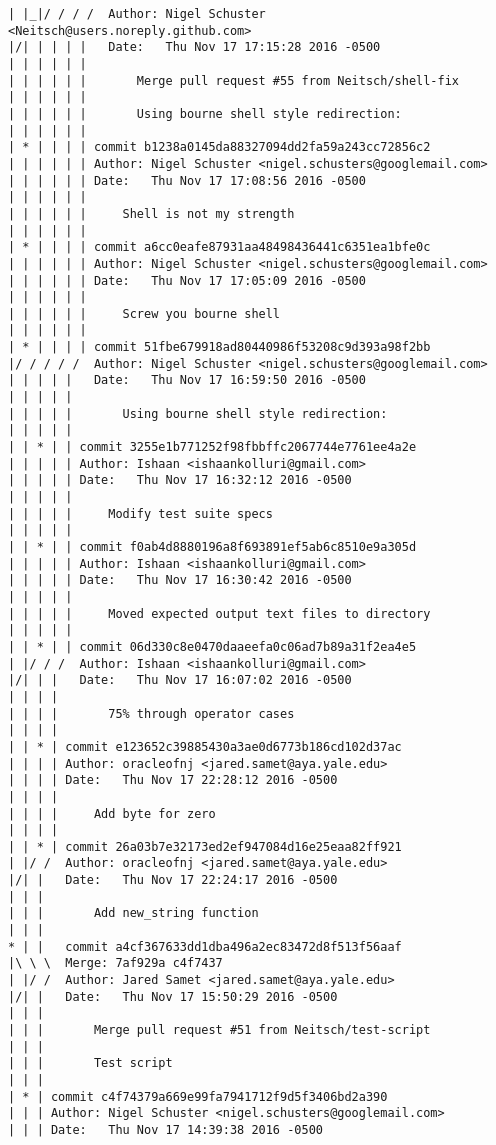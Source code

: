 \begin{lstlisting}
| |_|/ / / /  Author: Nigel Schuster <Neitsch@users.noreply.github.com>
|/| | | | |   Date:   Thu Nov 17 17:15:28 2016 -0500
| | | | | |   
| | | | | |       Merge pull request #55 from Neitsch/shell-fix
| | | | | |       
| | | | | |       Using bourne shell style redirection:
| | | | | |       
| * | | | | commit b1238a0145da88327094dd2fa59a243cc72856c2
| | | | | | Author: Nigel Schuster <nigel.schusters@googlemail.com>
| | | | | | Date:   Thu Nov 17 17:08:56 2016 -0500
| | | | | | 
| | | | | |     Shell is not my strength
| | | | | |       
| * | | | | commit a6cc0eafe87931aa48498436441c6351ea1bfe0c
| | | | | | Author: Nigel Schuster <nigel.schusters@googlemail.com>
| | | | | | Date:   Thu Nov 17 17:05:09 2016 -0500
| | | | | | 
| | | | | |     Screw you bourne shell
| | | | | |       
| * | | | | commit 51fbe679918ad80440986f53208c9d393a98f2bb
|/ / / / /  Author: Nigel Schuster <nigel.schusters@googlemail.com>
| | | | |   Date:   Thu Nov 17 16:59:50 2016 -0500
| | | | |   
| | | | |       Using bourne shell style redirection:
| | | | |      
| | * | | commit 3255e1b771252f98fbbffc2067744e7761ee4a2e
| | | | | Author: Ishaan <ishaankolluri@gmail.com>
| | | | | Date:   Thu Nov 17 16:32:12 2016 -0500
| | | | | 
| | | | |     Modify test suite specs
| | | | |      
| | * | | commit f0ab4d8880196a8f693891ef5ab6c8510e9a305d
| | | | | Author: Ishaan <ishaankolluri@gmail.com>
| | | | | Date:   Thu Nov 17 16:30:42 2016 -0500
| | | | | 
| | | | |     Moved expected output text files to directory
| | | | |      
| | * | | commit 06d330c8e0470daaeefa0c06ad7b89a31f2ea4e5
| |/ / /  Author: Ishaan <ishaankolluri@gmail.com>
|/| | |   Date:   Thu Nov 17 16:07:02 2016 -0500
| | | |   
| | | |       75% through operator cases
| | | |     
| | * | commit e123652c39885430a3ae0d6773b186cd102d37ac
| | | | Author: oracleofnj <jared.samet@aya.yale.edu>
| | | | Date:   Thu Nov 17 22:28:12 2016 -0500
| | | | 
| | | |     Add byte for zero
| | | |     
| | * | commit 26a03b7e32173ed2ef947084d16e25eaa82ff921
| |/ /  Author: oracleofnj <jared.samet@aya.yale.edu>
|/| |   Date:   Thu Nov 17 22:24:17 2016 -0500
| | |   
| | |       Add new_string function
| | |      
* | |   commit a4cf367633dd1dba496a2ec83472d8f513f56aaf
|\ \ \  Merge: 7af929a c4f7437
| |/ /  Author: Jared Samet <jared.samet@aya.yale.edu>
|/| |   Date:   Thu Nov 17 15:50:29 2016 -0500
| | |   
| | |       Merge pull request #51 from Neitsch/test-script
| | |       
| | |       Test script
| | |    
| * | commit c4f74379a669e99fa7941712f9d5f3406bd2a390
| | | Author: Nigel Schuster <nigel.schusters@googlemail.com>
| | | Date:   Thu Nov 17 14:39:38 2016 -0500

\end{lstlisting}
